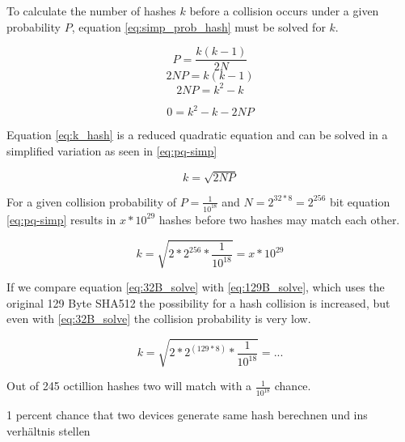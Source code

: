      
     To calculate the number of hashes $k$ before a collision occurs under a given probability $P$, equation \ref{eq:simp_prob_hash} must be solved for $k$.
     
     \begin{equation*}
         P = \frac{k(k - 1)}{2N}
     \end{equation*}
     \begin{equation*}
         2NP = k (k - 1)
     \end{equation*}
     \begin{equation*}
         2NP = k^2 - k
     \end{equation*}

     \begin{equation}
        \label{eq:k_hash}
         0 = k^2 - k - 2NP
     \end{equation}
     
     Equation \ref{eq:k_hash} is a reduced quadratic equation and can be solved in a simplified variation as seen in \ref{eq:pq-simp}
     
     \begin{equation}
         \label{eq:pq-simp}
         k = \sqrt{2NP}
     \end{equation}
     
     For a given collision probability of $P = \frac{1}{10^{18}}$ and $N = 2^{32 * 8} = 2^{256}$ bit equation \ref{eq:pq-simp} results in $x * 10^{29}$ hashes before two hashes may match each other.
     
     \begin{equation}
         \label{eq:32B_solve}
         k = \sqrt{2 * 2^{256} * \frac{1}{10^{18}}} = x * 10^{29}
     \end{equation}
     
     If we compare equation \ref{eq:32B_solve} with \ref{eq:129B_solve}, which uses the original 129 Byte SHA512 the possibility for a hash collision is increased, but even with \ref{eq:32B_solve} the collision probability is very low.
     
     \begin{equation}
         \label{eq:129B_solve}
         k = \sqrt{2 * 2^{(129 * 8)} * \frac{1}{10^{18}}} = ...
     \end{equation}
     
     Out of 245 octillion hashes two will match with a $\frac{1}{10^18}$ chance. 
     
     1 percent chance that two devices generate same hash
     berechnen und ins verhältnis stellen
     
